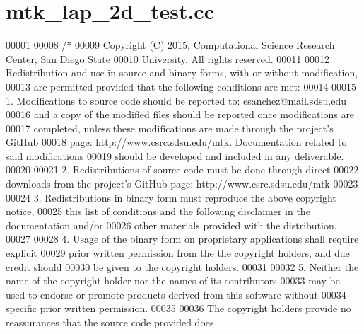 \hypertarget{mtk__lap__2d__test_8cc_source}{\section{mtk\+\_\+lap\+\_\+2d\+\_\+test.\+cc}
\label{mtk__lap__2d__test_8cc_source}
}

\begin{DoxyCode}
00001 
00008 \textcolor{comment}{/*}
00009 \textcolor{comment}{Copyright (C) 2015, Computational Science Research Center, San Diego State}
00010 \textcolor{comment}{University. All rights reserved.}
00011 \textcolor{comment}{}
00012 \textcolor{comment}{Redistribution and use in source and binary forms, with or without modification,}
00013 \textcolor{comment}{are permitted provided that the following conditions are met:}
00014 \textcolor{comment}{}
00015 \textcolor{comment}{1. Modifications to source code should be reported to: esanchez@mail.sdsu.edu}
00016 \textcolor{comment}{and a copy of the modified files should be reported once modifications are}
00017 \textcolor{comment}{completed, unless these modifications are made through the project's GitHub}
00018 \textcolor{comment}{page: http://www.csrc.sdsu.edu/mtk. Documentation related to said modifications}
00019 \textcolor{comment}{should be developed and included in any deliverable.}
00020 \textcolor{comment}{}
00021 \textcolor{comment}{2. Redistributions of source code must be done through direct}
00022 \textcolor{comment}{downloads from the project's GitHub page: http://www.csrc.sdsu.edu/mtk}
00023 \textcolor{comment}{}
00024 \textcolor{comment}{3. Redistributions in binary form must reproduce the above copyright notice,}
00025 \textcolor{comment}{this list of conditions and the following disclaimer in the documentation and/or}
00026 \textcolor{comment}{other materials provided with the distribution.}
00027 \textcolor{comment}{}
00028 \textcolor{comment}{4. Usage of the binary form on proprietary applications shall require explicit}
00029 \textcolor{comment}{prior written permission from the the copyright holders, and due credit should}
00030 \textcolor{comment}{be given to the copyright holders.}
00031 \textcolor{comment}{}
00032 \textcolor{comment}{5. Neither the name of the copyright holder nor the names of its contributors}
00033 \textcolor{comment}{may be used to endorse or promote products derived from this software without}
00034 \textcolor{comment}{specific prior written permission.}
00035 \textcolor{comment}{}
00036 \textcolor{comment}{The copyright holders provide no reassurances that the source code provided does}

\end{DoxyCode}
